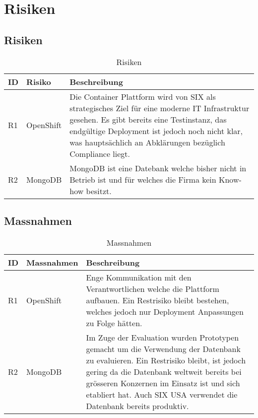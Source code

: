 \chapter{Risiken}

\section{Risiken}

\begin{table}[H]
	\centering
	\caption{Risiken}
	\begin{tabular}{ | p{1cm} | p{3cm} | p{11cm} |}
		\toprule
		{\textbf{ID}} & {\textbf{Risiko}} & {\textbf{Beschreibung} } \\
		\midrule
		R1 & OpenShift & Die Container Plattform wird von SIX als strategisches Ziel für eine moderne IT Infrastruktur gesehen. Es gibt bereits eine Testinstanz, das endgültige Deployment ist jedoch noch nicht klar, was hauptsächlich an Abklärungen bezüglich Compliance liegt.  \\ \hline
		R2 & MongoDB & MongoDB ist eine Datebank welche bisher nicht in Betrieb ist und für welches die Firma kein Know-how besitzt.\\
		\bottomrule
	\end{tabular}
\end{table}

\section{Massnahmen}
\begin{table}[H]
	\centering
	\caption{Massnahmen}
	\begin{tabular}{ | p{1cm} | p{3cm} | p{11cm} | }
		\toprule
		{\textbf{ID}} & {\textbf{Massnahmen}} & {\textbf{Beschreibung}} \\
		\midrule
		R1 & OpenShift & Enge Kommunikation mit den Verantwortlichen welche die Plattform aufbauen. Ein Restrisiko bleibt bestehen, welches jedoch nur Deployment Anpassungen zu Folge hätten. \\ \hline
		R2 & MongoDB & Im Zuge der Evaluation wurden Prototypen gemacht um die Verwendung der Datenbank zu evaluieren. Ein Restrisiko bleibt, ist jedoch gering da die Datenbank weltweit bereits bei grösseren Konzernen im Einsatz ist und sich etabliert hat. Auch SIX USA verwendet die Datenbank bereits produktiv. \\
		\bottomrule
	\end{tabular}
\end{table}